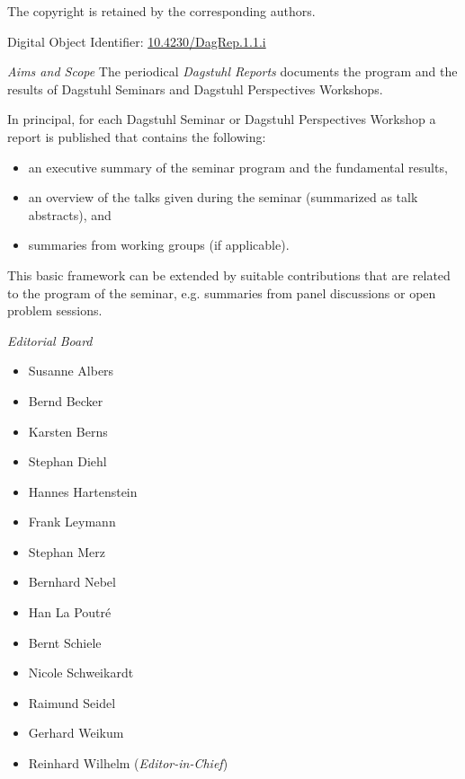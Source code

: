 \documentclass[a4paper,USenglish]{dagrep-master}
\begin{document}
\begin{publicationinfo}
\smallskip

The copyright is retained by the corresponding authors.

\vfill

Digital Object Identifier: \href{http://dx.doi.org/10.4230/DagRep.1.1.i}{10.4230/DagRep.1.1.i}

\newpage


\bigskip
\bigskip


\emph{Aims and Scope}\newline
The periodical \emph{Dagstuhl Reports} documents the program and the results of Dagstuhl Seminars and Dagstuhl Perspectives Workshops.

In principal, for each Dagstuhl Seminar or Dagstuhl Perspectives Workshop a report is published that contains the following:
\begin{itemize}
\item an executive summary of the seminar program and the fundamental results,
\item an overview of the talks given during the seminar (summarized as talk abstracts), and
\item summaries from working groups (if applicable).
\end{itemize}
This basic framework can be extended by suitable contributions that are related to the program of the seminar, e.g. summaries from panel discussions or open problem sessions.
 
\bigskip
\bigskip
\emph{Editorial Board}
\begin{itemize}
\item Susanne Albers
\item Bernd Becker
\item Karsten Berns
\item Stephan Diehl
\item Hannes Hartenstein
\item Frank Leymann
\item Stephan Merz
\item Bernhard Nebel
\item Han La Poutr\'{e}
\item Bernt Schiele
\item Nicole Schweikardt
\item Raimund Seidel
\item Gerhard Weikum
\item Reinhard Wilhelm (\emph{Editor-in-Chief})
\end{itemize}


\end{publicationinfo}
\end{document}
